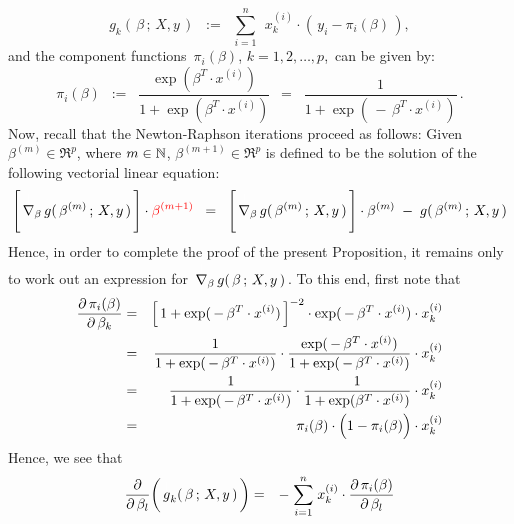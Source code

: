 \begin{enumerate}
	\begin{equation*}
	g_{k}(\,\beta\,;\,X,y\,)
	\;\; := \;\;
		\overset{n}{\underset{i=1}{\sum}}\;\, x^{(i)}_{k} \cdot \left(\,y_{i} - \pi_{i}(\beta)\,\right),
	\end{equation*}
	and the component functions \,$\pi_{i}(\beta)$, $k = 1,2,\ldots,p$,\, can be given by:
	\begin{equation*}
	\pi_{i}(\beta)
	\;\ := \;\;
		\dfrac{\exp(\beta^{T} \cdot x^{(i)})}{1+\exp(\beta^{T}\cdot x^{(i)})}
	\;\ = \;\;
		\dfrac{1}{1+\exp(\,-\,\beta^{T}\cdot x^{(i)})}\,.
	\end{equation*}
	Now, recall that the Newton-Raphson iterations proceed as follows:
	Given $\beta^{(m)} \in \Re^{p}$, where $m \in \mathbb{N}$, $\beta^{(m+1)} \in \Re^{p}$
	is defined to be the solution of the following vectorial linear equation:
	\begin{equation*}
	\left[\,\overset{{\color{white}\vert}}{\nabla}_{\beta}\,g(\,\beta^{(m)}\,;\,X,y\,)\,\right] \cdot {\color{red}\beta^{(m+1)}}
	\;\; = \;\;
		\left[\,\overset{{\color{white}\vert}}{\nabla}_{\beta}\,g(\,\beta^{(m)}\,;\,X,y\,)\,\right] \cdot \beta^{(m)}
		\; - \;
		g(\,\beta^{(m)}\,;\,X,y\,)
	\end{equation*}
	Hence, in order to complete the proof of the present Proposition,
	it remains only to work out an expression for
	\,$\overset{{\color{white}\vert}}{\nabla}_{\beta}\,g(\,\beta\,;\,X,y\,)$\,.
	To this end, first note that
	\begin{eqnarray*}
	\dfrac{\partial\,\pi_{i}(\beta)}{\partial\,\beta_{k}}
	&=&
		\left[\,1+\exp(\,-\,\beta^{T}\cdot x^{(i)})\,\right]^{-2}
		\cdot
		\exp(\,-\,\beta^{T}\cdot x^{(i)})
		\cdot
		x^{(i)}_{k}
	\\
	&=&
		\dfrac{1}{1+\exp(\,-\,\beta^{T}\cdot x^{(i)})}
		\cdot
		\dfrac{\exp(\,-\,\beta^{T}\cdot x^{(i)})}{1+\exp(\,-\,\beta^{T}\cdot x^{(i)})}
		\cdot
		x^{(i)}_{k}
	\\
	&=&
		\dfrac{1}{1+\exp(\,-\,\beta^{T}\cdot x^{(i)})}
		\cdot
		\dfrac{1}{1+\exp(\beta^{T}\cdot x^{(i)})}
		\cdot
		x^{(i)}_{k}
	\\
	&=&
		\pi_{i}(\beta)
		\cdot
		\left(1\overset{{\color{white}.}}{-}\pi_{i}(\beta)\right)
		\cdot
		x^{(i)}_{k}
	\end{eqnarray*}
	Hence, we see that
	\begin{eqnarray*}
	\dfrac{\partial}{\partial\,\beta_{l}}\!\left(\,\overset{{\color{white}\vert}}{g}_{k}(\,\beta\,;\,X,y\,)\,\right)
	& = &
		-\;\overset{n}{\underset{i=1}{\sum}}\;x^{(i)}_{k}\cdot\dfrac{\partial\,\pi_{i}(\beta)}{\partial\,\beta_{l}}

\end{eqnarray*}
\end{enumerate}

